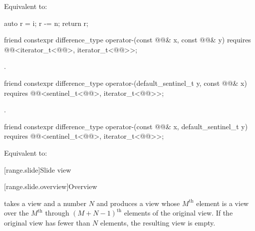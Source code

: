 \begin{itemdescr}
\pnum
\effects
Equivalent to:
\begin{codeblock}
auto r = i;
r -= n;
return r;
\end{codeblock}
\end{itemdescr}

%
\begin{itemdecl}
friend constexpr difference_type operator-(const @@& x, const @@& y)
  requires @@<iterator_t<@@>, iterator_t<@@>>;
\end{itemdecl}

\begin{itemdescr}
\pnum
\returns
{}.
\end{itemdescr}

%
\begin{itemdecl}
friend constexpr difference_type operator-(default_sentinel_t y, const @@& x)
  requires @@<sentinel_t<@@>, iterator_t<@@>>;
\end{itemdecl}

\begin{itemdescr}
\pnum
\returns
{}.
\end{itemdescr}

%
\begin{itemdecl}
friend constexpr difference_type operator-(const @@& x, default_sentinel_t y)
  requires @@<sentinel_t<@@>, iterator_t<@@>>;
\end{itemdecl}

\begin{itemdescr}
\pnum
\effects
Equivalent to: 
\end{itemdescr}

[range.slide]{Slide view}

[range.slide.overview]{Overview}

\pnum
{} takes a view and a number $N$ and
produces a view
whose $M^\text{th}$ element is a view over
the $M^\text{th}$ through
$(M + N - 1)^\text{th}$ elements
of the original view.
If the original view has fewer than $N$ elements,
the resulting view is empty.

